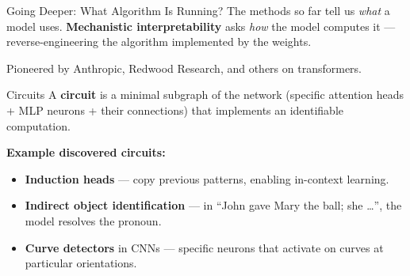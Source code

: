 \documentclass[aspectratio=169]{beamer}
\begin{document}
\begin{frame}{Going Deeper: What Algorithm Is Running?}
  The methods so far tell us \emph{what} a model uses.
  \textbf{Mechanistic interpretability} asks \emph{how} the model computes it —
  reverse-engineering the algorithm implemented by the weights.

  \vspace{0.6em}
  Pioneered by Anthropic, Redwood Research, and others on transformers.

  \vspace{0.5em}
  \begin{block}{Circuits}
    A \textbf{circuit} is a minimal subgraph of the network
    (specific attention heads + MLP neurons + their connections)
    that implements an identifiable computation.
  \end{block}

  \vspace{0.5em}
  \textbf{Example discovered circuits:}
  \begin{itemize}
    \item \textbf{Induction heads} — copy previous patterns,
          enabling in-context learning.
    \item \textbf{Indirect object identification} — in
          ``John gave Mary the ball; she …'', the model resolves the pronoun.
    \item \textbf{Curve detectors} in CNNs — specific neurons that activate on
          curves at particular orientations.
  \end{itemize}
\end{frame}
\end{document}
